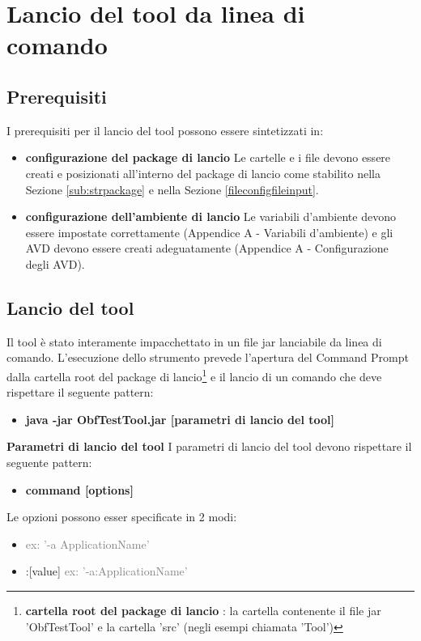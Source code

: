 \newpage
\section{Lancio del tool da linea di comando}

 \subsection{Prerequisiti}
 I prerequisiti per il lancio del tool possono essere sintetizzati in:
\begin{itemize}[nosep]
\item [$\blacksquare$]  \textbf{configurazione del package di lancio} \newline
Le cartelle e i file devono essere creati e posizionati all'interno del package di lancio come stabilito nella Sezione \ref{sub:strpackage} e nella Sezione \ref{fileconfigfileinput}.
\item [$\blacksquare$]  \textbf{ configurazione dell'ambiente di lancio} \newline
Le variabili d'ambiente devono essere impostate correttamente (Appendice A - Variabili d'ambiente) e gli AVD devono essere creati adeguatamente (Appendice A - Configurazione degli AVD).
\end{itemize}

\subsection{Lancio del tool}
Il tool è stato interamente impacchettato in un file jar lanciabile da linea di comando. L'esecuzione dello strumento prevede l'apertura del Command Prompt dalla cartella root del package di lancio\footnote{\textbf{cartella root del package di lancio} : la cartella contenente il file jar 'ObfTestTool' e la cartella 'src' (negli esempi chiamata 'Tool')} e il lancio di un comando che deve rispettare il seguente pattern: 
\begin{itemize}[nosep]
\item[] \textbf{java -jar ObfTestTool.jar [parametri di lancio del tool]}
\end{itemize}

\bigskip
\noindent\textbf{Parametri di lancio del tool} \newline
I parametri di lancio del tool devono rispettare il seguente pattern: 
\begin{itemize}[nosep]
\item[] \textbf{command [options]} 
\end{itemize}
\noindent Le opzioni possono esser specificate in 2 modi: 
\begin{itemize}[nosep]
\item [1.]  [option] [value] \newline
\textcolor{gray}{ex: '-a ApplicationName'}
\item[2.]  [option]:[value] \newline
\textcolor{gray}{ex:  '-a:ApplicationName'}
\end{itemize}


